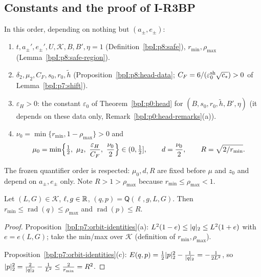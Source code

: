 \subsection{Constants and the proof of I-R3BP}\label{bpI:p8:sec-proof}

\begin{definition}[Choice of $\mu_0$, $d$, $R$]\label{bpI:p8:constants}
In this order, depending on nothing but $(a_\pm,e_\pm)$:
\begin{enumerate}[label=(\arabic*)]
\item $t,a_\pm',e_\pm',U,\mathcal K,B,B',\eta=1$ (Definition~\ref{bpI:p8:safe}), $r_{\min},\rho_{\max}$ (Lemma~\ref{bpI:p8:safe-region}).
\item $\delta_2,\mu_2,C_F,s_0,r_0,\tilde h$ (Proposition~\ref{bpI:p8:head-data}; $C_F=6/(\varepsilon_0^{\rm sh}\sqrt{c_*})>0$ of Lemma~\ref{bpI:p7:shift}).
\item $\varepsilon_H>0$: the constant $\varepsilon_0$ of Theorem~\ref{bpI:p0:head} for $(B,s_0,r_0,\tilde h,B',\eta)$ (it depends on these data only, Remark~\ref{bpI:p0:head-remarks}(a)).
\item $\nu_0=\min\{r_{\min},1-\rho_{\max}\}>0$ and
\[
\mu_0=\min\Bigl\{\tfrac12,\ \mu_2,\ \frac{\varepsilon_H}{C_F},\ \frac{\nu_0}2\Bigr\}\in(0,\tfrac12],\qquad d=\frac{\nu_0}2,\qquad R=\sqrt{2/r_{\min}} .
\]
\end{enumerate}
The frozen quantifier order is respected: $\mu_0,d,R$ are fixed before $\mu$ and $z_0$ and depend on $a_\pm,e_\pm$ only. Note $R>1>\rho_{\max}$ because $r_{\min}\le\rho_{\max}<1$.
\end{definition}

\begin{lemma}\label{bpI:p8:bounds}
Let $(L,G)\in\mathcal K$, $\ell,g\in\mathbb{R}$, $(q,p)=\mathsf Q(\ell,g,L,G)$. Then $r_{\min}\le\operatorname{rad}(q)\le\rho_{\max}$ and $\operatorname{rad}(p)\le R$.
\end{lemma}
\begin{proof}
\label{stepI:p8:bd-r} Proposition~\ref{bpI:p7:orbit-identities}(a): $L^2(1-e)\le\lvert q\rvert_2\le L^2(1+e)$ with $e=e(L,G)$; take the min/max over $\mathcal K$ (definition of $r_{\min},\rho_{\max}$).

\label{stepI:p8:bd-p} Proposition~\ref{bpI:p7:orbit-identities}(c): $E(q,p)=\frac12\lvert p\rvert_2^2-\frac1{\lvert q\rvert_2}=-\frac1{2L^2}$, so $\lvert p\rvert_2^2=\frac2{\lvert q\rvert_2}-\frac1{L^2}\le\frac2{r_{\min}}=R^2$.
\end{proof}

